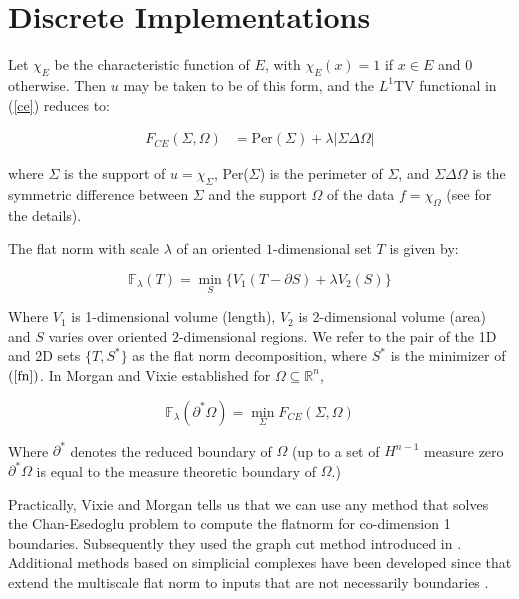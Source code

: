 \documentclass[12pt]{article}
\begin{document}
\section{Discrete Implementations}

Let $\chi_E$ be the characteristic function of $E$, with $\chi_E(x) = 1$ if $x \in E$ and $0$ otherwise. Then $u$ may be taken to be of this form, and the $L^1$TV functional in (\ref{ce}) reduces to:

\begin{align*}
F_{CE}(\Sigma,\Omega) &= \text{Per}(\Sigma) + \lambda|\Sigma \Delta \Omega|
\end{align*}

 \noindent where $\Sigma$ is the support of $u = \chi_\Sigma$, Per($\Sigma$) is the perimeter of $\Sigma$, and $\Sigma \Delta \Omega$ is the symmetric difference between $\Sigma$ and the support $\Omega$ of the data $f = \chi_\Omega$ (see \cite{ce} for the details). 

The flat norm with scale $\lambda$ of an oriented $1$-dimensional set $T$ is given by:

\begin{equation} \label{fn}
\mathbb{F}_\lambda(T) = \min_S \{V_1(T-\partial S) + \lambda V_2(S)\}
\end{equation}

 \noindent  Where $V_1$ is 1-dimensional volume (length), $V_2$ is 2-dimensional volume (area) and $S$ varies over oriented $2$-dimensional regions. We refer to the pair of the 1D and 2D sets $\{T,S^*\}$ as the flat norm decomposition, where $S^*$ is the minimizer of $(\ref{fn})$. In \cite{Morgan_2007} Morgan and Vixie established for $\Omega \subseteq \mathbb{R}^n$,

\begin{equation}
\mathbb{F}_\lambda(\partial^* \Omega) = \min_{\Sigma} F_{CE}(\Sigma,\Omega)
\end{equation}

 \noindent Where $\partial^*$ denotes the reduced boundary of $\Omega$ (up to a set of $H^{n-1}$ measure zero $\partial^* \Omega$ is equal to the measure theoretic boundary of $\Omega$.)

Practically, Vixie and Morgan \cite{shapes} tells us that we can use any method that solves the Chan-Esedoglu problem to compute the flatnorm for co-dimension 1 boundaries. Subsequently they used the graph cut method introduced in \cite{kolmogorov}. Additional methods based on simplicial complexes have been developed since that  extend the multiscale flat norm to inputs that are not necessarily boundaries \cite{ibrahim_simplicial}.
\end{document}
